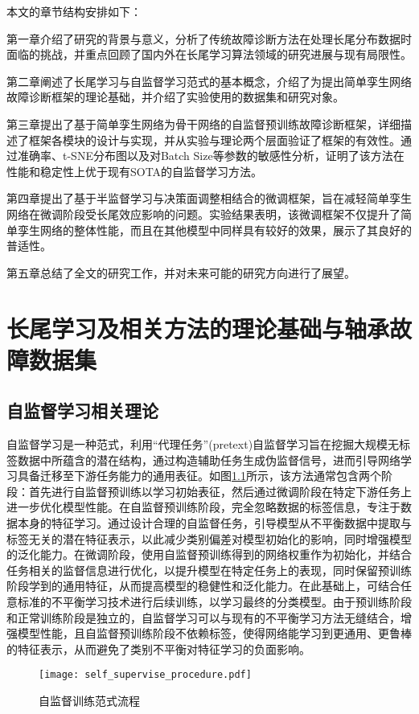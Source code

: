 \documentclass[master]{thesis-uestc}
\begin{document}
本文的章节结构安排如下：

第一章介绍了研究的背景与意义，分析了传统故障诊断方法在处理长尾分布数据时面临的挑战，并重点回顾了国内外在长尾学习算法领域的研究进展与现有局限性。

第二章阐述了长尾学习与自监督学习范式的基本概念，介绍了为提出简单孪生网络故障诊断框架的理论基础，并介绍了实验使用的数据集和研究对象。

第三章提出了基于简单孪生网络为骨干网络的自监督预训练故障诊断框架，详细描述了框架各模块的设计与实现，并从实验与理论两个层面验证了框架的有效性。通过准确率、t-SNE分布图以及对Batch Size等参数的敏感性分析，证明了该方法在性能和稳定性上优于现有SOTA的自监督学习方法。

第四章提出了基于半监督学习与决策面调整相结合的微调框架，旨在减轻简单孪生网络在微调阶段受长尾效应影响的问题。实验结果表明，该微调框架不仅提升了简单孪生网络的整体性能，而且在其他模型中同样具有较好的效果，展示了其良好的普适性。

第五章总结了全文的研究工作，并对未来可能的研究方向进行了展望。


\chapter{长尾学习及相关方法的理论基础与轴承故障数据集}
\section{自监督学习相关理论}
自监督学习是一种范式，利用“代理任务”(pretext)自监督学习旨在挖掘大规模无标签数据中所蕴含的潜在结构，通过构造辅助任务生成伪监督信号，进而引导网络学习具备迁移至下游任务能力的通用表征。如图\ref{self_supervise_procedure}所示，该方法通常包含两个阶段：首先进行自监督预训练以学习初始表征，然后通过微调阶段在特定下游任务上进一步优化模型性能。在自监督预训练阶段，完全忽略数据的标签信息，专注于数据本身的特征学习。通过设计合理的自监督任务，引导模型从不平衡数据中提取与标签无关的潜在特征表示，以此减少类别偏差对模型初始化的影响，同时增强模型的泛化能力。在微调阶段，使用自监督预训练得到的网络权重作为初始化，并结合任务相关的监督信息进行优化，以提升模型在特定任务上的表现，同时保留预训练阶段学到的通用特征，从而提高模型的稳健性和泛化能力。在此基础上，可结合任意标准的不平衡学习技术进行后续训练，以学习最终的分类模型。由于预训练阶段和正常训练阶段是独立的，自监督学习可以与现有的不平衡学习方法无缝结合，增强模型性能，且自监督预训练阶段不依赖标签，使得网络能学习到更通用、更鲁棒的特征表示，从而避免了类别不平衡对特征学习的负面影响。
\begin{figure}[h]
    \texttt{[image: self\_supervise\_procedure.pdf]}
    \caption{自监督训练范式流程}
    \label{self_supervise_procedure}
\end{figure}
\FloatBarrier  %
\end{document}
